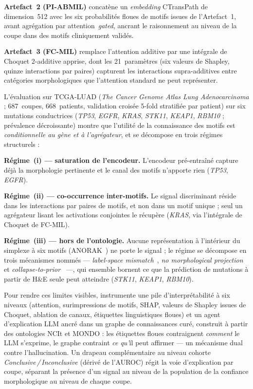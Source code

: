 \textbf{Artefact~2 (PI-ABMIL)} concatène un \emph{embedding}
CTransPath de dimension~512 avec les six probabilités floues de
motifs issues de l'Artefact~1, avant agrégation par
attention~\emph{gated}, ancrant le raisonnement au niveau de la
coupe dans des motifs cliniquement validés.

\textbf{Artefact~3 (FC-MIL)} remplace l'attention additive par
une intégrale de Choquet 2-additive apprise, dont les
21~paramètres (six valeurs de Shapley, quinze interactions par
paires) capturent les interactions supra-additives entre
catégories morphologiques que l'attention standard ne peut
représenter.

L'évaluation sur TCGA-LUAD (\emph{The Cancer Genome Atlas Lung
Adenocarcinoma} ; 687~coupes, 668~patients, validation croisée
5-fold stratifiée par patient) sur six mutations conductrices
(\textit{TP53}, \textit{EGFR}, \textit{KRAS}, \textit{STK11},
\textit{KEAP1}, \textit{RBM10} ; prévalence décroissante)
montre que l'utilité de la connaissance des motifs est
\emph{conditionnelle au gène et à l'agrégateur}, et se décompose
en trois régimes structurels :

\textbf{Régime~(i) --- saturation de l'encodeur.}
L'encodeur pré-entraîné capture déjà la morphologie pertinente
et le canal des motifs n'apporte rien (\textit{TP53},
\textit{EGFR}).

\textbf{Régime~(ii) --- co-occurrence inter-motifs.}
Le signal discriminant réside dans les interactions par paires
de motifs, et non dans un motif unique ; seul un agrégateur
lisant les activations conjointes le récupère (\textit{KRAS},
via l'intégrale de Choquet de FC-MIL).

\textbf{Régime~(iii) --- hors de l'ontologie.}
Aucune représentation à l'intérieur du simplexe à six motifs
(ANORAK~\cite{anorak2024}) ne porte le signal ; le régime se
décompose en trois mécanismes nommés --- \emph{label-space
mismatch}~\cite{lipton2018labelshift}, \emph{no morphological
projection} et
\emph{collapse-to-prior}~\cite{bowman2016posteriorcollapse} ---,
qui ensemble bornent ce que la prédiction de mutations à partir
de H\&E seule peut atteindre (\textit{STK11}, \textit{KEAP1},
\textit{RBM10}).

Pour rendre ces limites visibles, \lchai{} instrumente une pile
d'interprétabilité à six niveaux (attention, surimpressions de
motifs, SHAP, valeurs de Shapley issues de Choquet, ablation de
canaux, étiquettes linguistiques floues) et un agent
d'explication LLM ancré dans un graphe de connaissances curé,
construit à partir des ontologies NCIt et MONDO : les étiquettes
floues contraignent \emph{comment} le LLM s'exprime, le graphe
contraint \emph{ce qu'}il peut affirmer --- un mécanisme dual
contre l'hallucination.
Un drapeau complémentaire au niveau cohorte
\emph{Conclusive\,/\,Inconclusive} (dérivé de l'AUROC) régit la
voie d'explication par coupe, séparant la présence d'un signal au
niveau de la population de la confiance morphologique au niveau
de chaque coupe.

